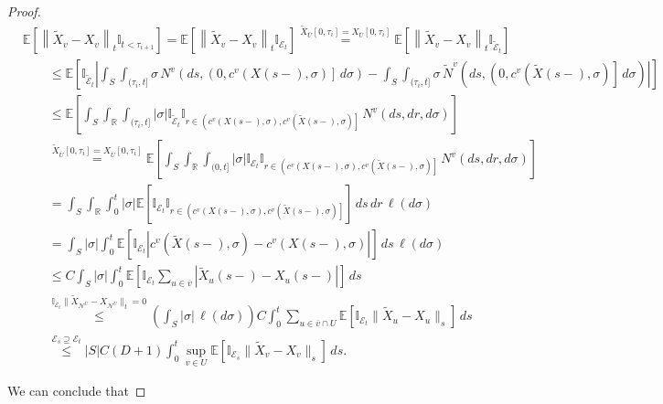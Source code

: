 \documentclass[12pt]{article}
\newcommand{\mb}{\mathbb}
\newcommand{\mc}{\mathcal}
\newcommand{\ov}{\overline}
\newcommand{\os}{\overset}
\newcommand{\ind}{\hspace{24pt}}
\newcommand{\ex}[1]{\mb{E}\left[#1\right]}			%
\renewcommand{\v}{v}							%
\newcommand{\vv}{u}								%
\renewcommand{\U}{U}							%
\renewcommand{\S}{S}							%
\newcommand{\s}{\sigma}							%
\renewcommand{\t}{t}							%
\renewcommand{\tt}{s}							%
\newcommand{\X}{X}								%
\newcommand{\IGr}{c}							%
\newcommand{\neigh}{\mc{N}}						%
\newcommand{\vind}[1]{^{#1}}					%
\newcommand{\cind}[1]{_{#1}}					%
\newcommand{\cl}{\ov}							%
\newcommand{\tp}[1]{(#1)}						%
\newcommand{\tip}[1]{#1}						%
\newcommand{\ts}[1]{_{#1}}						%
\newcommand{\const}{C}							%
\newcommand{\degr}{D}							%
\newcommand{\poiss}{N}							%
\newcommand{\Sm}{\ell}							%
\renewcommand{\r}{r}							%
\newcommand{\alt}[1]{\widetilde{#1}}			%
\newcommand{\indx}[1]{_{#1}}					%
\newcommand{\rt}{\tau}							%
\newcommand{\evnt}{\mc{E}}						%
\begin{document}
\begin{proof}
\begin{align*}
&\ex{\left\|\alt{\X}\cind{\v} - \X\cind{\v}\right\|_{\t}\mb{I}_{\t < \rt\indx{i+1}}} = \ex{\left\|\alt{\X}\cind{\v} - \X\cind{\v}\right\|_{\t}\mb{I}_{\evnt\ts{\t}}}\os{\alt{\X}\cind{\cl{\U}}\tip{[0,\rt\indx{i}]} = \X\cind{\cl{\U}}\tip{[0,\rt\indx{i}]}}{=} \ex{\left\|\alt{\X}\cind{\v} - \X\cind{\v}\right\|_{\t}\mb{I}_{\alt{\evnt}\ts{\t}}}\\
&\ind\leq \ex{\mb{I}_{\alt{\evnt}\ts{\t}}\left|\int_\S\int_{(\rt\indx{i},\t]} \s\,\poiss\vind{\v}\left(d\tt,\left(0,\IGr\vind{\v}(\X\tp{\tt-},\s)\right]\,d\s\right) - \int_\S\int_{(\rt\indx{i},\t]} \s\,\alt{\poiss}\vind{\v}\left(d\tt,\left(0,\IGr\vind{\v}(\alt{\X}\tp{\tt-},\s)\right]\,d\s\right)\right|}\\
&\ind \leq \ex{\int_\S\int_{\mb{R}}\int_{(\rt\indx{i},\t]}|\s|\mb{I}_{\alt{\evnt}\ts{\t}}\mb{I}_{\r\in \left(\IGr\vind{\v}(\X\tp{\tt-},\s), \IGr\vind{\v}(\alt{\X}\tp{\tt-},\s)\right]}\,\poiss\vind{\v}\left(d\tt,d\r,d\s\right)}\\
&\ind \os{\alt{\X}\cind{\cl{\U}}\tip{[0,\rt\indx{i}]} = \X\cind{\cl{\U}}\tip{[0,\rt\indx{i}]}}{=} \ex{\int_\S\int_{\mb{R}}\int_{(0,\t]}|\s|\mb{I}_{\evnt\ts{\t}}\mb{I}_{\r\in \left(\IGr\vind{\v}(\X\tp{\tt-},\s), \IGr\vind{\v}(\alt{\X}\tp{\tt-},\s)\right]}\,\poiss\vind{\v}\left(d\tt,d\r,d\s\right)}\\
&\ind = \int_\S\int_\mb{R}\int_0^\t |\s|\ex{\mb{I}_{\evnt\ts{\t}}\mb{I}_{\r\in\left(\IGr\vind{\v}(\X\tp{\tt-},\s),\IGr\vind{\v}(\alt{\X}\tp{\tt-},\s)\right]}}\,d\tt\,d\r\,\Sm(d\s)\\
&\ind = \int_\S |\s|\int_0^\t \ex{\mb{I}_{\evnt\ts{\t}}\left|\IGr\vind{\v}(\alt{\X}\tp{\tt-},\s) - \IGr\vind{\v}(\X\tp{\tt-},\s)\right|}\,d\tt\,\Sm(d\s)\\
&\ind \leq \const\int_\S|\s|\int_0^\t\ex{\mb{I}_{\evnt\ts{\t}}\sum_{\vv\in \cl{\v}}\left|\alt{\X}\cind{\vv}\tp{\tt-} - \X\cind{\vv}\tp{\tt-}\right|}\,d\tt\\
&\ind \os{\mb{I}_{\evnt\ts{\t}}\|\alt{\X}\cind{\neigh\vind{\U}} - \X\cind{\neigh\vind{\U}}\|_\t = 0}{\leq} \left(\int_\S|\s|\,\Sm(d\s)\right)\const \int_0^\t \sum_{\vv\in \cl{\v}\cap\U}\ex{\mb{I}_{\evnt\ts{\t}}\|\alt{\X}\cind{\vv} - \X\cind{\vv}\|_\tt}\,d\tt\\
&\ind \os{\evnt\ts{\tt} \supseteq \evnt\ts{\t}}{\leq} |\S|\const(\degr+1) \int_0^\t \sup_{\v\in \U}\ex{\mb{I}_{\evnt\ts{\tt}}\|\alt{\X}\cind{\v} - \X\cind{\v}\|_\tt}\,d\tt.
\end{align*}

We can conclude that


\end{proof}
\end{document}
